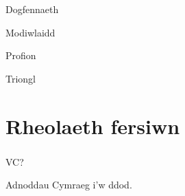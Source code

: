 \documentclass{beamer}
\begin{document}
\begin{frame}
Dogfennaeth
\end{frame}

\begin{frame}
Modiwlaidd
\end{frame}

\begin{frame}
Profion
\end{frame}

\begin{frame}
Triongl
\end{frame}

\section[]{Rheolaeth fersiwn}
\begin{frame}
\frametitle{\hfill}
\end{frame}

\begin{frame}
VC?
\end{frame}

\begin{frame}
Adnoddau Cymraeg i'w ddod.
\end{frame}
\end{document}
